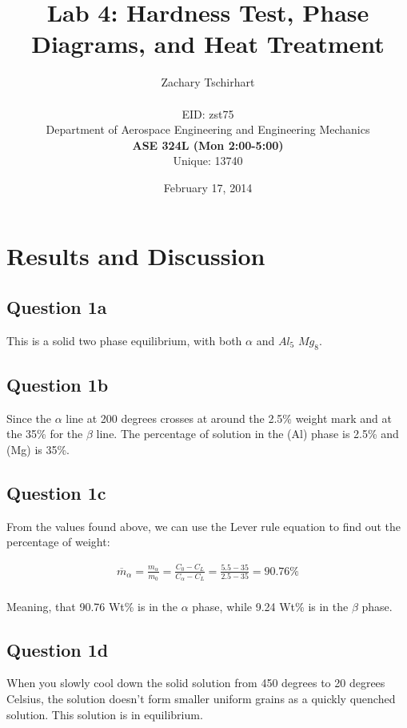 \documentclass[12pt]{report}
\title{Lab 4: Hardness Test, Phase Diagrams, and Heat Treatment}
\author{Zachary Tschirhart \\
	\small \\
        \small EID: zst75 \\
	\small Department of Aerospace Engineering and Engineering Mechanics \\
	\small \textbf{ASE 324L (Mon 2:00-5:00)} \\
	\small Unique: 13740}
\date{February 17, 2014}
\begin{document}
\maketitle

\setcounter{secnumdepth}{0}

\section{Results and Discussion}
\doublespacing

\subsection{Question 1a}

This is a solid two phase equilibrium, with both \(\alpha\) and \(Al_5\) \(Mg_8\).

\subsection{Question 1b}

Since the \(\alpha\) line at 200 degrees crosses at around the 2.5\% weight mark and at the 35\% for the \(\beta\) line. The percentage of solution in the (Al) phase is 2.5\% and (Mg) is 35\%.

\subsection{Question 1c}

From the values found above, we can use the Lever rule equation to find out the percentage of weight:

\begin{equation}
\begin{split}
  \overline{m}_{\alpha} = \frac{m_{\alpha}}{m_0} = \frac{C_0 - C_L}{C_{\alpha} - C_L} 
  = \frac{5.5 - 35}{2.5 - 35} = 90.76\% 
\end{split}
\end{equation}
\\

Meaning, that 90.76 Wt\% is in the \(\alpha\) phase, while 9.24 Wt\% is in the \(\beta\) phase.

\subsection{Question 1d}

When you slowly cool down the solid solution from 450 degrees to 20 degrees Celsius, the solution doesn't form smaller uniform grains as a quickly quenched solution. This solution is in equilibrium. 
\end{document}
